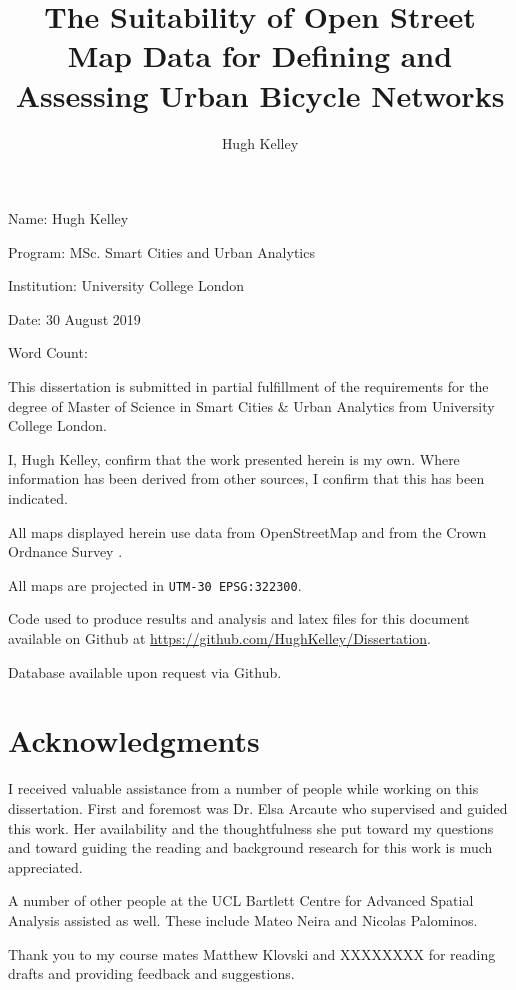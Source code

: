 \documentclass[hidelinks,11pt]{article} %
\title{The Suitability of Open Street Map Data for Defining and Assessing Urban Bicycle Networks}
\author{Hugh Kelley}
\begin{document}
\maketitle

\pagebreak


Name: Hugh Kelley

Program: MSc. Smart Cities and Urban Analytics

Institution: University College London

Date: 30 August 2019

Word Count:

This dissertation is submitted in partial fulfillment of the requirements for the degree of Master of Science in Smart Cities \& Urban Analytics from University College London.

I, Hugh Kelley, confirm that the work presented herein is my own. Where information has been derived from other sources, I confirm that this has been indicated.
\pagebreak

All maps displayed herein use data from OpenStreetMap  and from the Crown Ordnance Survey .

\medskip
 
All maps are projected in \texttt{UTM-30 EPSG:322300}.

\medskip

Code used to produce results and analysis and latex files for this document available on Github at \url{https://github.com/HughKelley/Dissertation}. 

\medskip

Database available upon request via Github. 

\pagebreak

\section{Acknowledgments}

I received valuable assistance from a number of people while working on this dissertation. First and foremost was Dr. Elsa Arcaute who supervised and guided this work. Her availability and the thoughtfulness she put toward my questions and toward guiding the reading and background research for this work is much appreciated. 

A number of other people at the UCL Bartlett Centre for Advanced Spatial Analysis assisted as well. These include  Mateo Neira and Nicolas Palominos. 

Thank you to my course mates Matthew Klovski and XXXXXXXX for reading drafts and providing feedback and suggestions. 
\end{document}
